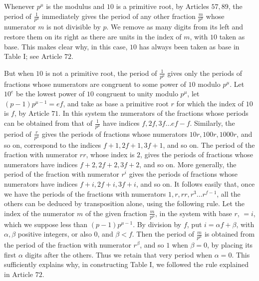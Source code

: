 Whenever \(p^\mu\) is the modulus and \(10\) is a primitive root, by Articles \(57,89\), the period of \(\frac1{p^\mu}\) immediately gives the period of any other fraction \(\frac m{p^\mu}\) whose numerator \(m\) is not divisible by \(p\). We remove as many digits from its left and restore them on its right as there are units in the index of \(m\), with \(10\) taken as base. This makes clear why, in this case, \(10\) has always been taken as base in Table I; see Article \(72\).

\begin{samepage}
But when \(10\) is not a primitive root, the period of \(\frac1{p^\mu}\) gives only the periods of fractions whose numerators are congruent to some power of \(10\) modulo \(p^\mu\). Let \(10^e\) be the lowest power of \(10\) congruent to unity modulo \(p^\mu\), let \((p-1)p^{\mu-1}=ef\), and take as base a primitive root \(r\) for which the index of \(10\) is \(f\), by Article \(71\). In this system the numerators of the fractions whose periods can be obtained from that of \(\frac1{p^\mu}\) have indices \(f,2f,3f\ldots ef-f\). Similarly, the period of \(\frac r{p^\mu}\) gives the periods of fractions whose numerators \(10r,100r,1000r\), and so on, correspond to the indices \(f+1,2f+1,3f+1\), and so on. The period of the fraction with numerator \(rr\), whose index is \(2\), gives the periods of fractions whose numerators
have indices \(f+2,2f+2,3f+2\), and so on. More generally, the period of the fraction with numerator \(r^i\) gives the periods of fractions whose numerators have indices \(f+i,2f+i,3f+i\), and so on. It follows easily that, once we have the periods of the fractions with numerators \(1,r,rr,r^3\ldots r^{f-1}\), all the others can be deduced by transposition alone, using the following rule. Let the index of the numerator \(m\) of the given fraction \(\frac m{p^\mu}\), in the system with base \(r\), \(=i\), which we suppose less than \((p-1)p^{\mu-1}\). By division by \(f\), put \(i=\alpha f+\beta\), with \(\alpha,\beta\) positive integers, or also \(0\), and \(\beta<f\). Then the period of \(\frac m{p^\mu}\) is obtained from the period of the fraction with numerator \(r^\beta\), and so \(1\) when \(\beta=0\), by placing its first \(\alpha\) digits after the others. Thus we retain that very period when \(\alpha=0\). This sufficiently explains why, in constructing Table I, we followed the rule explained in Article \(72\).
\par\end{samepage}

